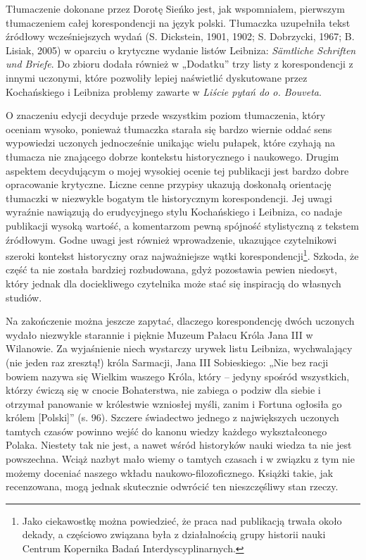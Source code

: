 \documentclass[a4paper]{article}
\begin{document}
Tłumaczenie dokonane przez Dorotę Sieńko jest, jak wspomniałem, pierwszym tłumaczeniem całej korespondencji na język
polski. Tłumaczka uzupełniła tekst źródłowy wcześniejszych wydań \label{ref:RND7xLlLu4TfG}(S. Dickstein, 1901, 1902; S.
Dobrzycki, 1967; B. Lisiak, 2005) w oparciu o krytyczne wydanie listów Leibniza: \textit{Sämtliche Schriften und
Briefe}. Do zbioru dodała również w „Dodatku” trzy listy z korespondencji z innymi uczonymi, które pozwoliły lepiej
naświetlić dyskutowane przez Kochańskiego i Leibniza problemy zawarte w \textit{Liście pytań do o. Bouveta}.

O znaczeniu edycji decyduje przede wszystkim poziom tłumaczenia, który oceniam wysoko, ponieważ tłumaczka starała się
bardzo wiernie oddać sens wypowiedzi uczonych jednocześnie unikając wielu pułapek, które czyhają na tłumacza nie
znającego dobrze kontekstu historycznego i naukowego. Drugim aspektem decydującym o mojej wysokiej ocenie tej
publikacji jest bardzo dobre opracowanie krytyczne. Liczne cenne przypisy ukazują doskonałą orientację tłumaczki w
niezwykle bogatym tle historycznym korespondencji. Jej uwagi wyraźnie nawiązują do erudycyjnego stylu Kochańskiego i
Leibniza, co nadaje publikacji wysoką wartość, a komentarzom pewną spójność stylistyczną z tekstem źródłowym. Godne
uwagi jest również wprowadzenie, ukazujące czytelnikowi szeroki kontekst historyczny oraz najważniejsze wątki
korespondencji\footnote{ Jako ciekawostkę można powiedzieć, że praca nad publikacją trwała około dekady, a częściowo
związana była z działalnością grupy historii nauki Centrum Kopernika Badań Interdyscyplinarnych.}. Szkoda, że część ta
nie została bardziej rozbudowana, gdyż pozostawia pewien niedosyt, który jednak dla dociekliwego czytelnika może stać
się inspiracją do własnych studiów.

Na zakończenie można jeszcze zapytać, dlaczego korespondencję dwóch uczonych wydało niezwykle starannie i pięknie Muzeum
Pałacu Króla Jana III w Wilanowie. Za wyjaśnienie niech wystarczy urywek listu Leibniza, wychwalający (nie jeden raz
zresztą!) króla Sarmacji, Jana III Sobieskiego: „Nie bez racji bowiem nazywa się Wielkim waszego Króla, który – jedyny
spośród wszystkich, którzy ćwiczą się w cnocie Bohaterstwa, nie zabiega o podziw dla siebie i otrzymał panowanie w
królestwie wzniosłej myśli, zanim i Fortuna ogłosiła go królem [Polski]” (s. 96). Szczere świadectwo jednego z
największych uczonych tamtych czasów powinno wejść do kanonu wiedzy każdego wykształconego Polaka. Niestety tak nie
jest, a nawet wśród historyków nauki wiedza ta nie jest powszechna. Wciąż nazbyt mało wiemy o tamtych czasach i w
związku z tym nie możemy doceniać naszego wkładu naukowo-filozoficznego. Książki takie, jak recenzowana, mogą jednak
skutecznie odwrócić ten nieszczęśliwy stan rzeczy.
\end{document}
